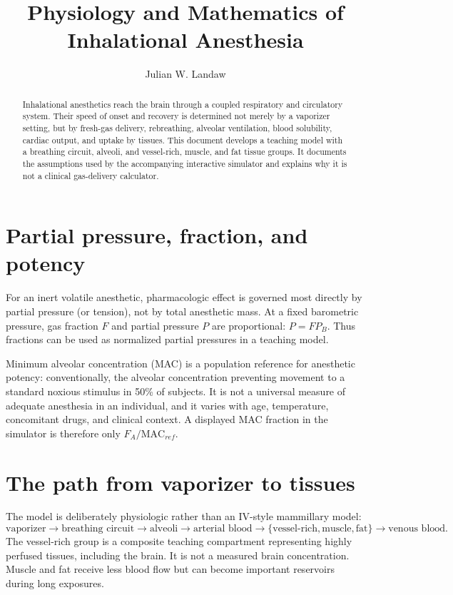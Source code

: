 \documentclass[11pt]{article}
\title{Physiology and Mathematics of Inhalational Anesthesia}
\author{Julian W. Landaw}
\date{}
\begin{document}
\maketitle
\begin{abstract}
Inhalational anesthetics reach the brain through a coupled respiratory and circulatory system. Their speed of onset and recovery is determined not merely by a vaporizer setting, but by fresh-gas delivery, rebreathing, alveolar ventilation, blood solubility, cardiac output, and uptake by tissues. This document develops a teaching model with a breathing circuit, alveoli, and vessel-rich, muscle, and fat tissue groups. It documents the assumptions used by the accompanying interactive simulator and explains why it is not a clinical gas-delivery calculator.
\end{abstract}
\section{Partial pressure, fraction, and potency}
For an inert volatile anesthetic, pharmacologic effect is governed most directly by partial pressure (or tension), not by total anesthetic mass. At a fixed barometric pressure, gas fraction $F$ and partial pressure $P$ are proportional: $P=F P_B$. Thus fractions can be used as normalized partial pressures in a teaching model.

Minimum alveolar concentration (MAC) is a population reference for anesthetic potency: conventionally, the alveolar concentration preventing movement to a standard noxious stimulus in 50\% of subjects. It is not a universal measure of adequate anesthesia in an individual, and it varies with age, temperature, concomitant drugs, and clinical context. A displayed MAC fraction in the simulator is therefore only $F_A/\mathrm{MAC}_{ref}$.

\section{The path from vaporizer to tissues}
The model is deliberately physiologic rather than an IV-style mammillary model:
\begin{equation}
\text{vaporizer} \rightarrow \text{breathing circuit} \rightarrow \text{alveoli} \rightarrow \text{arterial blood} \rightarrow \{
\text{vessel-rich},\text{muscle},\text{fat}\} \rightarrow \text{venous blood}.
\end{equation}
The vessel-rich group is a composite teaching compartment representing highly perfused tissues, including the brain. It is not a measured brain concentration. Muscle and fat receive less blood flow but can become important reservoirs during long exposures.
\end{document}
